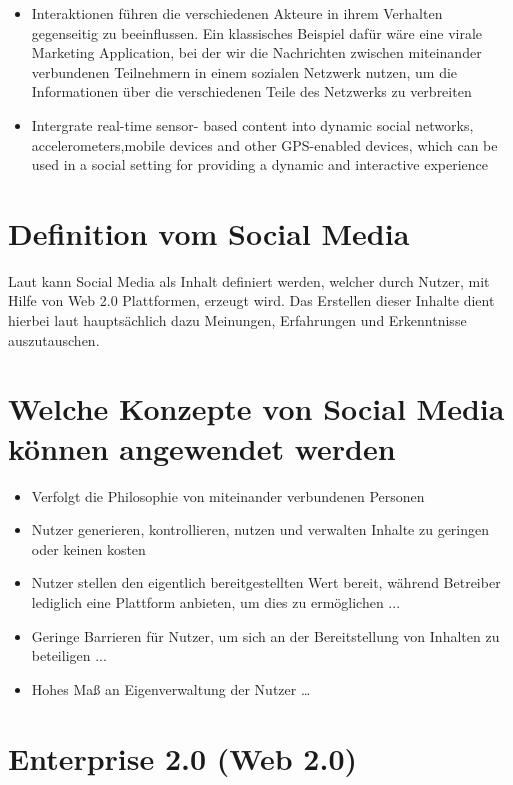 \begin{itemize}
\item Interaktionen  führen  die verschiedenen Akteure in ihrem Verhalten gegenseitig zu beeinflussen. Ein klassisches Beispiel dafür wäre eine virale Marketing Application, bei der wir die Nachrichten zwischen miteinander verbundenen Teilnehmern in einem sozialen Netzwerk nutzen, um die Informationen über die verschiedenen Teile des Netzwerks zu verbreiten
\item Intergrate real-time sensor- based content into dynamic social networks, accelerometers,mobile devices and other GPS-enabled devices, which can be used in a social setting for providing a dynamic and interactive experience
\end{itemize}


\section{Definition vom Social Media}

Laut \textcite[S. 8]{turban:sc} kann Social Media als Inhalt definiert werden, welcher durch Nutzer, mit Hilfe von Web 2.0 Plattformen, erzeugt wird. Das Erstellen dieser Inhalte dient hierbei laut \textcite[S. 8]{turban:sc} hauptsächlich dazu Meinungen, Erfahrungen und Erkenntnisse auszutauschen.


\section{Welche Konzepte von Social Media können angewendet werden}

\begin{itemize}
\item Verfolgt die Philosophie von miteinander verbundenen Personen \parencite[S. 8]{turban:sc}
\item Nutzer generieren, kontrollieren, nutzen und verwalten Inhalte zu geringen
oder keinen kosten \parencite[S. 8]{turban:sc}
\item Nutzer stellen den eigentlich bereitgestellten Wert bereit, während Betreiber lediglich eine Plattform anbieten, um dies zu ermöglichen ...
\item Geringe Barrieren für Nutzer, um sich an der Bereitstellung von Inhalten zu
beteiligen ...
\item Hohes Maß an Eigenverwaltung der Nutzer …
\end{itemize}


\section{Enterprise 2.0 (Web 2.0)}


